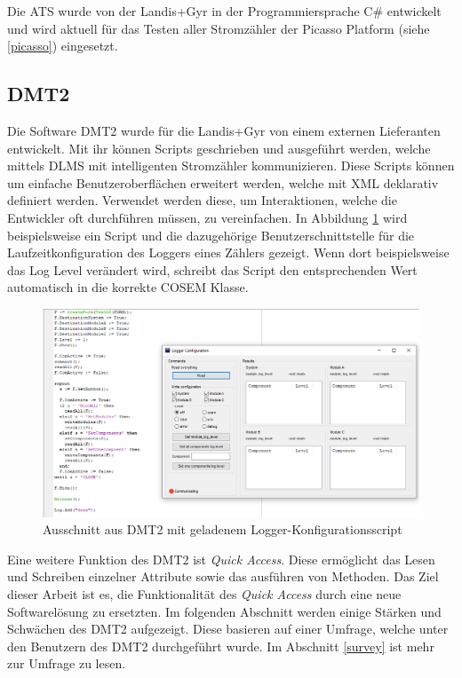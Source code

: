 Die \ac{ATS} wurde von der Landis+Gyr in der Programmiersprache C\# entwickelt und wird aktuell für das Testen aller Stromzähler der Picasso Platform (siehe \ref{picasso}) eingesetzt.



\subsection{DMT2}\label{dmt}
Die Software \ac{DMT2} wurde für die Landis+Gyr von einem externen Lieferanten entwickelt.
Mit ihr können Scripts geschrieben und ausgeführt werden, welche mittels \ac{DLMS} mit intelligenten Stromzähler kommunizieren.
Diese Scripts können um einfache Benutzeroberflächen erweitert werden, welche mit XML deklarativ definiert werden.
Verwendet werden diese, um Interaktionen, welche die Entwickler oft durchführen müssen, zu vereinfachen.
In Abbildung \ref{fig:dmt2logger} wird beispielsweise ein Script und die dazugehörige Benutzerschnittstelle für die Laufzeitkonfiguration des Loggers eines Zählers gezeigt.
Wenn dort beispielsweise das Log Level verändert wird, schreibt das Script den entsprechenden Wert automatisch in die korrekte \ac{COSEM} Klasse.
\begin{figure}[H]
   \centering
   \includegraphics[width=1.0\textwidth]{gfx/dmt2logger.png}
   \caption{
      Ausschnitt aus \ac{DMT2} mit geladenem Logger-Konfigurationsscript
   }
   \label{fig:dmt2logger}
\end{figure}

Eine weitere Funktion des \ac{DMT2} ist \textit{Quick Access}.
Diese ermöglicht das Lesen und Schreiben einzelner Attribute sowie das ausführen von Methoden.
Das Ziel dieser Arbeit ist es, die Funktionalität des \textit{Quick Access} durch eine neue Softwarelösung zu ersetzten.
Im folgenden Abschnitt werden einige Stärken und Schwächen des \ac{DMT2} aufgezeigt.
Diese basieren auf einer Umfrage, welche unter den Benutzern des \ac{DMT2} durchgeführt wurde.
Im Abschnitt \ref{survey} ist mehr zur Umfrage zu lesen.

